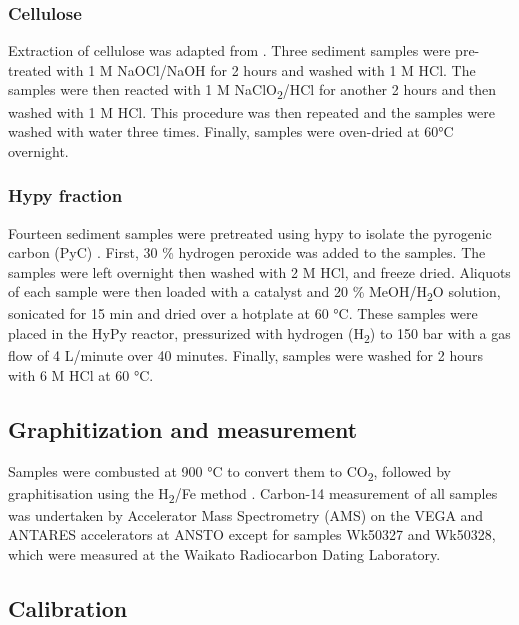 \documentclass[
  12pt,
]{book}
\begin{document}
\hypertarget{cellulose}{%
\subsubsection{Cellulose}\label{cellulose}}

Extraction of cellulose was adapted from \citet{gillespieNovelCellulosepreparationMethod2019}. Three sediment samples were pre-treated with 1 M NaOCl/NaOH for 2 hours and washed with 1 M HCl. The samples were then reacted with 1 M NaClO\textsubscript{2}/HCl for another 2 hours and then washed with 1 M HCl. This procedure was then repeated and the samples were washed with water three times. Finally, samples were oven-dried at 60°C overnight.

\hypertarget{hypy-fraction}{%
\subsubsection{Hypy fraction}\label{hypy-fraction}}

Fourteen sediment samples were pretreated using hypy to isolate the pyrogenic carbon (PyC) \citep{ascoughHydropyrolysisNewTool2009, meredithAssessmentHydropyrolysisMethod2012}. First, 30 \% hydrogen peroxide was added to the samples. The samples were left overnight then washed with 2 M HCl, and freeze dried. Aliquots of each sample were then loaded with a catalyst and 20 \% MeOH/H\textsubscript{2}O solution, sonicated for 15 min and dried over a hotplate at 60 °C. These samples were placed in the HyPy reactor, pressurized with hydrogen (H\textsubscript{2}) to 150 bar with a gas flow of 4 L/minute over 40 minutes. Finally, samples were washed for 2 hours with 6 M HCl at 60 °C.

\hypertarget{graphitization-and-measurement}{%
\subsection{Graphitization and measurement}\label{graphitization-and-measurement}}

Samples were combusted at 900 °C to convert them to CO\textsubscript{2}, followed by graphitisation using the H\textsubscript{2}/Fe method \citep{huaProgressRadiocarbonTarget2001}. Carbon-14 measurement of all samples was undertaken by Accelerator Mass Spectrometry (AMS) on the VEGA and ANTARES accelerators at ANSTO \citep{finkANTARESAMSFacility2004} except for samples Wk50327 and Wk50328, which were measured at the Waikato Radiocarbon Dating Laboratory.

\hypertarget{calibration}{%
\subsection{Calibration}\label{calibration}}
\end{document}

